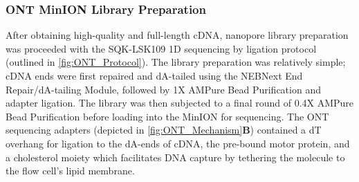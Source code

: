 \subsubsection{ONT MinION Library Preparation}
\label{sec: ONTlib_preparation}
After obtaining high-quality and full-length cDNA, nanopore library preparation was proceeded with the SQK-LSK109 1D sequencing by ligation protocol (outlined in \cref{fig:ONT_Protocol}). The library preparation was relatively simple; cDNA ends were first repaired and dA-tailed using the NEBNext End Repair/dA-tailing Module, followed by 1X AMPure Bead Purification and adapter ligation. The library was then subjected to a final round of 0.4X AMPure Bead Purification before loading into the MinION for sequencing. The ONT sequencing adapters (depicted in \cref{fig:ONT_Mechanism}\textbf{B}) contained a dT overhang for ligation to the dA-ends of cDNA, the pre-bound motor protein, and a cholesterol moiety which facilitates DNA capture by tethering the molecule to the flow cell's lipid membrane.


